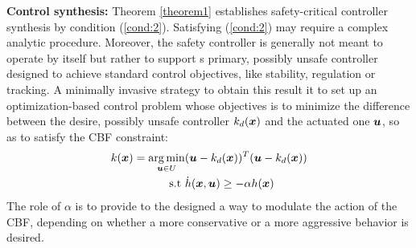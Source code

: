 \textbf{Control synthesis:} Theorem  \ref{theorem1} establishes safety-critical controller synthesis by condition (\ref{cond:2}). Satisfying  (\ref{cond:2}) may require a complex analytic procedure. Moreover, the safety controller is generally not meant to operate by itself but rather to support s primary, possibly unsafe controller designed to achieve standard control objectives, like stability, regulation or tracking. A minimally invasive strategy to obtain this result it to set up an optimization-based control problem whose objectives is to minimize the difference between the desire, possibly unsafe controller $k_d(\boldsymbol{x})$ and the actuated one $\boldsymbol{u}$, so as to satisfy the CBF constraint:
\begin{equation}
\begin{aligned}
k(\boldsymbol{x})=\underset{\boldsymbol{u}\in U}{\arg\min}  &(\boldsymbol{u}-k_d(\boldsymbol{x}))^T(\boldsymbol{u}-k_d(\boldsymbol{x})) \\ 
\mathrm{s.t}\,\, &\dot{h}(\boldsymbol{x},\boldsymbol{u})\geq -\alpha h(\boldsymbol{x})
\end{aligned}
\end{equation}
The role of $\alpha$ is to provide to the designed a way to modulate the action of the CBF, depending on whether a more conservative or a more aggressive behavior is desired.